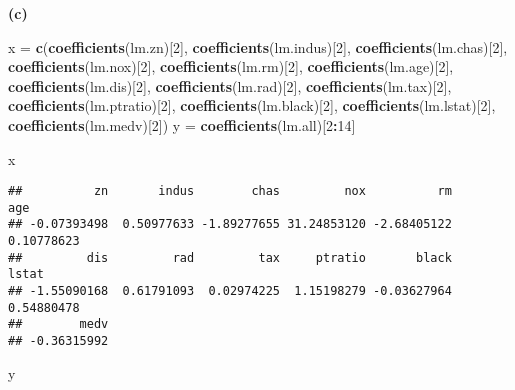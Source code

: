 \documentclass[
]{article}
\newenvironment{Shaded}{\begin{snugshade}}{\end{snugshade}}
\newcommand{\DecValTok}[1]{\textcolor[rgb]{0.00,0.00,0.81}{#1}}
\newcommand{\FunctionTok}[1]{\textcolor[rgb]{0.13,0.29,0.53}{\textbf{#1}}}
\newcommand{\NormalTok}[1]{#1}
\newcommand{\OtherTok}[1]{\textcolor[rgb]{0.56,0.35,0.01}{#1}}
\newcommand{\SpecialCharTok}[1]{\textcolor[rgb]{0.81,0.36,0.00}{\textbf{#1}}}
\begin{document}
\textbf{(c)}

\begin{Shaded}
\begin{Highlighting}[]
\NormalTok{x }\OtherTok{=} \FunctionTok{c}\NormalTok{(}\FunctionTok{coefficients}\NormalTok{(lm.zn)[}\DecValTok{2}\NormalTok{],}
      \FunctionTok{coefficients}\NormalTok{(lm.indus)[}\DecValTok{2}\NormalTok{],}
      \FunctionTok{coefficients}\NormalTok{(lm.chas)[}\DecValTok{2}\NormalTok{],}
      \FunctionTok{coefficients}\NormalTok{(lm.nox)[}\DecValTok{2}\NormalTok{],}
      \FunctionTok{coefficients}\NormalTok{(lm.rm)[}\DecValTok{2}\NormalTok{],}
      \FunctionTok{coefficients}\NormalTok{(lm.age)[}\DecValTok{2}\NormalTok{],}
      \FunctionTok{coefficients}\NormalTok{(lm.dis)[}\DecValTok{2}\NormalTok{],}
      \FunctionTok{coefficients}\NormalTok{(lm.rad)[}\DecValTok{2}\NormalTok{],}
      \FunctionTok{coefficients}\NormalTok{(lm.tax)[}\DecValTok{2}\NormalTok{],}
      \FunctionTok{coefficients}\NormalTok{(lm.ptratio)[}\DecValTok{2}\NormalTok{],}
      \FunctionTok{coefficients}\NormalTok{(lm.black)[}\DecValTok{2}\NormalTok{],}
      \FunctionTok{coefficients}\NormalTok{(lm.lstat)[}\DecValTok{2}\NormalTok{],}
      \FunctionTok{coefficients}\NormalTok{(lm.medv)[}\DecValTok{2}\NormalTok{])}
\NormalTok{y }\OtherTok{=} \FunctionTok{coefficients}\NormalTok{(lm.all)[}\DecValTok{2}\SpecialCharTok{:}\DecValTok{14}\NormalTok{]}
\end{Highlighting}
\end{Shaded}

\begin{Shaded}
\begin{Highlighting}[]
\NormalTok{x}
\end{Highlighting}
\end{Shaded}

\begin{verbatim}
##          zn       indus        chas         nox          rm         age 
## -0.07393498  0.50977633 -1.89277655 31.24853120 -2.68405122  0.10778623 
##         dis         rad         tax     ptratio       black       lstat 
## -1.55090168  0.61791093  0.02974225  1.15198279 -0.03627964  0.54880478 
##        medv 
## -0.36315992
\end{verbatim}

\begin{Shaded}
\begin{Highlighting}[]
\NormalTok{y}
\end{Highlighting}
\end{Shaded}
\end{document}

